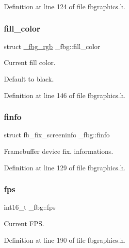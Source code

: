 Definition at line 124 of file fbgraphics.\+h.

\mbox{\label{struct__fbg_ad3cac82bd9448a4020a4e08621f5269a}} 
\subsubsection{\texorpdfstring{fill\+\_\+color}{fill\_color}}
{\footnotesize\ttfamily struct \mbox{\hyperlink{fbgraphics_8h_struct__fbg__rgb}{\+\_\+fbg\+\_\+rgb}} \+\_\+fbg\+::fill\+\_\+color}



Current fill color. 

Default to black. 

Definition at line 146 of file fbgraphics.\+h.

\mbox{\label{struct__fbg_a954dd14a4129eed7ebe09f31bd025861}} 
\subsubsection{\texorpdfstring{finfo}{finfo}}
{\footnotesize\ttfamily struct fb\+\_\+fix\+\_\+screeninfo \+\_\+fbg\+::finfo}



Framebuffer device fix. informations. 



Definition at line 129 of file fbgraphics.\+h.

\mbox{\label{struct__fbg_a64b16363bc48d1e19141df2e242930a9}} 
\subsubsection{\texorpdfstring{fps}{fps}}
{\footnotesize\ttfamily int16\+\_\+t \+\_\+fbg\+::fps}



Current F\+PS. 



Definition at line 190 of file fbgraphics.\+h.

\mbox{\label{struct__fbg_af447e6ed58d893989c8dad075807a79b}} 
